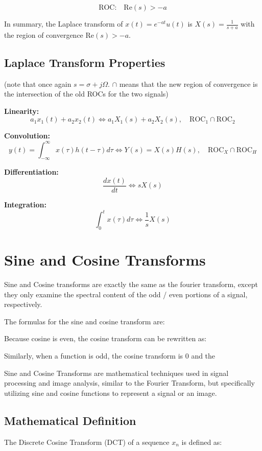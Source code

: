 \documentclass[12pt]{article}
\begin{document}
\[
\text{ROC:} \quad \text{Re}(s) > -a
\]

In summary, the Laplace transform of \( x(t) = e^{-at}u(t) \) is \( X(s) = \frac{1}{s + a} \) with the region of convergence \( \text{Re}(s) > -a \).

\subsection{Laplace Transform Properties}
(note that once again \(s = \sigma + j\Omega\). \(\cap\) means that the new region of convergence is the intersection of the old ROCs for the two signals)

\textbf{Linearity:}
\[
a_1 x_1(t) + a_2 x_2(t) \iff a_1 X_1(s) + a_2 X_2(s), \quad \text{ROC}_1 \cap \text{ROC}_2
\]

\textbf{Convolution:}
\[
y(t) = \int_{-\infty}^{\infty} x(\tau) h(t - \tau) d\tau \iff Y(s) = X(s) H(s), \quad \text{ROC}_X \cap \text{ROC}_H
\]

\textbf{Differentiation:}
\[
\frac{d x(t)}{dt} \iff s X(s)
\]

\textbf{Integration:}
\[
\int_{0}^{t} x(\tau) d\tau \iff \frac{1}{s} X(s)
\]


\section{Sine and Cosine Transforms}

Sine and Cosine transforms are exactly the same as the fourier transform, except they only examine the spectral content of the odd / even portions of a signal, respectively. 

The formulas for the sine and cosine transform are: 

Because cosine is even, the cosine transform can be rewritten as:

Similarly, when a function is odd, the cosine transform is 0 and the 

Sine and Cosine Transforms are mathematical techniques used in signal processing and image analysis, similar to the Fourier Transform, but specifically utilizing sine and cosine functions to represent a signal or an image.

\subsection{Mathematical Definition}

The Discrete Cosine Transform (DCT) of a sequence \( x_n \) is defined as:
\end{document}
